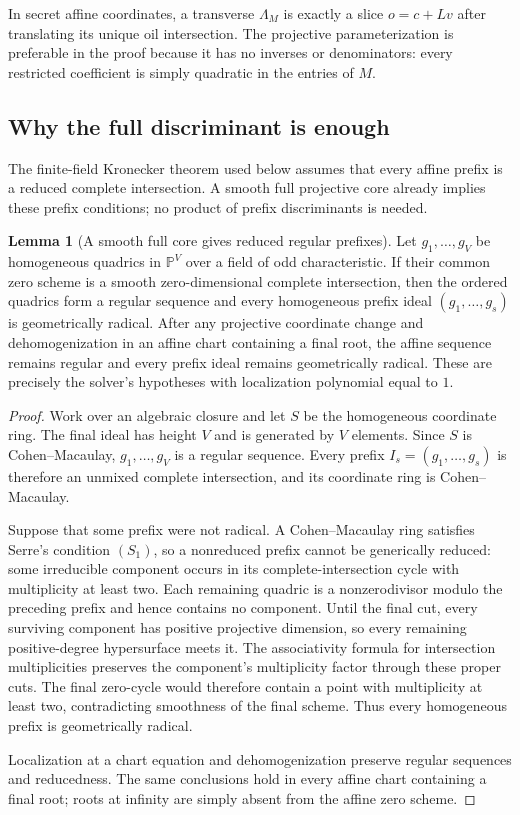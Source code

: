 \documentclass[11pt,a4paper]{article}
\theoremstyle{definition}
\newtheorem{lemma}[theorem]{Lemma}
\theoremstyle{remark}
\newcommand{\PP}{\mathbb P}
\begin{document}
In secret affine coordinates, a transverse $\Lambda_M$ is exactly a slice $o=c+Lv$ after translating its unique oil intersection.  The projective parameterization is preferable in the proof because it has no inverses or denominators: every restricted coefficient is simply quadratic in the entries of $M$.

\subsection{Why the full discriminant is enough}

The finite-field Kronecker theorem used below assumes that every affine prefix is a reduced complete intersection.  A smooth full projective core already implies these prefix conditions; no product of prefix discriminants is needed.

\begin{lemma}[A smooth full core gives reduced regular prefixes]\label{lem:full-implies-prefix}
Let $g_1,\ldots,g_V$ be homogeneous quadrics in $\PP^V$ over a field of odd characteristic.  If their common zero scheme is a smooth zero-dimensional complete intersection, then the ordered quadrics form a regular sequence and every homogeneous prefix ideal $(g_1,\ldots,g_s)$ is geometrically radical.  After any projective coordinate change and dehomogenization in an affine chart containing a final root, the affine sequence remains regular and every prefix ideal remains geometrically radical.  These are precisely the solver's hypotheses with localization polynomial equal to $1$.
\end{lemma}

\begin{proof}
Work over an algebraic closure and let $S$ be the homogeneous coordinate ring.  The final ideal has height $V$ and is generated by $V$ elements.  Since $S$ is Cohen--Macaulay, $g_1,\ldots,g_V$ is a regular sequence.  Every prefix $I_s=(g_1,\ldots,g_s)$ is therefore an unmixed complete intersection, and its coordinate ring is Cohen--Macaulay.

Suppose that some prefix were not radical.  A Cohen--Macaulay ring satisfies Serre's condition $(S_1)$, so a nonreduced prefix cannot be generically reduced: some irreducible component occurs in its complete-intersection cycle with multiplicity at least two.  Each remaining quadric is a nonzerodivisor modulo the preceding prefix and hence contains no component.  Until the final cut, every surviving component has positive projective dimension, so every remaining positive-degree hypersurface meets it.  The associativity formula for intersection multiplicities preserves the component's multiplicity factor through these proper cuts.  The final zero-cycle would therefore contain a point with multiplicity at least two, contradicting smoothness of the final scheme.  Thus every homogeneous prefix is geometrically radical.

Localization at a chart equation and dehomogenization preserve regular sequences and reducedness.  The same conclusions hold in every affine chart containing a final root; roots at infinity are simply absent from the affine zero scheme.
\end{proof}
\end{document}
